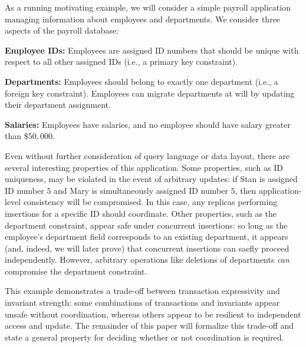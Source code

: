 


 As a running motivating example, we will
consider a simple payroll application managing information about
employees and departments. We consider three aspects of the payroll
database:
\begin{myitemize}
\item\textbf{Employee IDs:} Employees are assigned ID numbers that
  should be unique with respect to all other assigned IDs (i.e., a
  primary key constraint).
\item\textbf{Departments:} Employees should belong to exactly one
  department (i.e., a foreign key constraint). Employees can migrate
  departments at will by updating their department assignment.
\item\textbf{Salaries:} Employees have salaries, and no employee
  should have salary greater than $\$50,000$.
\end{myitemize}
Even without further consideration of query language or data layout,
there are several interesting properties of this application. Some
properties, such as ID uniqueness, may be violated in the event of
arbitrary updates: if Stan is assigned ID number $5$ and Mary is
simultaneously assigned ID number $5$, then application-level
consistency will be compromised. In this case, any replicas performing
insertions for a specific ID should coordinate. Other properties, such
as the department constraint, appear safe under concurrent insertions:
so long as the employee's department field corresponds to an existing
department, it appears (and, indeed, we will later prove) that
concurrent insertions can saefly proceed independently. However,
arbitrary operations like deletions of departments \textit{can}
compromise the department constraint.

This example demonstrates a trade-off between transaction expressivity
and invariant strength: some combinations of transactions and
invariants appear unsafe without coordination, whereas others appear
to be resilient to independent access and update. The remainder of this paper
will formalize this trade-off and state a general
property for deciding whether or not coordination is required.
